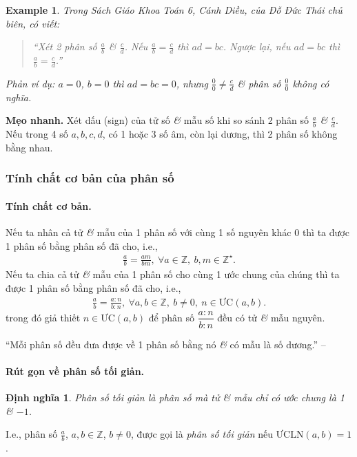 \documentclass{article}
\numberwithin{equation}{section}
\newtheorem{dinhnghia}{Định nghĩa}[section]
\newtheorem{example}{Example}[section]
\begin{document}
\begin{example}
	Trong Sách Giáo Khoa Toán 6, Cánh Diều, của Đỗ Đức Thái chủ biên, có viết:
	\begin{quotation}
		``Xét 2 phân số $\frac{a}{b}$ \textit{\&} $\frac{c}{d}$. Nếu $\frac{a}{b} = \frac{c}{d}$ thì $ad = bc$. Ngược lại, nếu $ad = bc$ thì $\frac{a}{b} = \frac{c}{d}$.''
	\end{quotation}
	Phản ví dụ: $a = 0$, $b = 0$ thì $ad = bc = 0$, nhưng $\frac{0}{0}\ne\frac{c}{d}$ \textit{\&} phân số $\frac{0}{0}$ không có nghĩa.
\end{example}
\textbf{Mẹo nhanh.} Xét dấu (sign) của tử số \textit{\&} mẫu số khi so sánh 2 phân số $\frac{a}{b}$ \textit{\&} $\frac{c}{d}$. Nếu trong 4 số $a,b,c,d$, có 1 hoặc 3 số âm, còn lại dương, thì 2 phân số không bằng nhau.

\subsubsection{Tính chất cơ bản của phân số}

\paragraph{Tính chất cơ bản.}
Nếu ta nhân cả tử \textit{\&} mẫu của 1 phân số với cùng 1 số nguyên khác 0 thì ta được 1 phân số bằng phân số đã cho, i.e.,
\begin{align*}
	\frac{a}{b} = \frac{am}{bm},\ \forall a\in\mathbb{Z},\ b,m\in\mathbb{Z}^\star.
\end{align*}
Nếu ta chia cả tử \textit{\&} mẫu của 1 phân số cho cùng 1 ước chung của chúng thì ta được 1 phân số bằng phân số đã cho, i.e.,
\begin{align*}
	\frac{a}{b} = \frac{a:n}{b:n},\ \forall a,b\in\mathbb{Z},\ b\ne 0,\ n\in\mbox{ƯC}(a,b).
\end{align*}
trong đó giả thiết $n\in\mbox{ƯC}(a,b)$ để phân số $\dfrac{a:n}{b:n}$ đều có tử \textit{\&} mẫu nguyên.

``Mỗi phân số đều đưa được về 1 phân số bằng nó \textit{\&} có mẫu là số dương.'' -- \cite[p. 28]{SGK_Toan_6_Canh_Dieu_tap_2}

\paragraph{Rút gọn về phân số tối giản.}
\begin{dinhnghia}
	\emph{Phân số tối giản} là phân số mà tử \textit{\&} mẫu chỉ có ước chung là 1 \textit{\&} $-1$.
\end{dinhnghia}
I.e., phân số $\frac{a}{b}$, $a,b\in\mathbb{Z}$, $b\ne 0$, được gọi là \emph{phân số tối giản} nếu $\mbox{ƯCLN}(a,b) = 1$.
\end{document}
